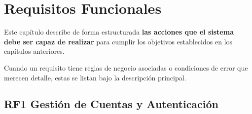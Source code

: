 \section{Requisitos Funcionales}
Este capítulo describe de forma estructurada \textbf{las acciones que el sistema debe
ser capaz de realizar} para cumplir los objetivos establecidos en los capítulos
anteriores. 
\par
\vspace{4mm}
Cuando un requisito tiene reglas de negocio asociadas o
condiciones de error que merecen detalle, estas se listan bajo
la descripción principal.

\subsection{RF1 Gestión de Cuentas y Autenticación}
